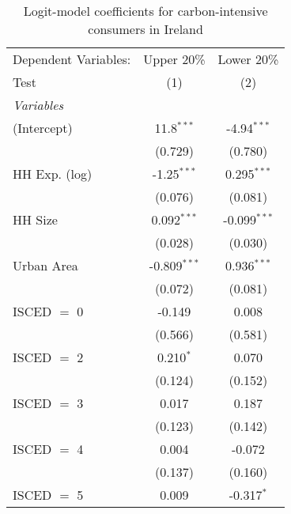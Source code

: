 
\begin{table}[htbp!]
   \centering
   \small
   \begin{adjustbox}{width = 1\textwidth, max height = 0.95\textheight, center}
      \begin{threeparttable}[b]
         \caption{\label{tab:Logit_1_IRL} Logit-model coefficients for carbon-intensive consumers in Ireland}
         \begin{tabular}{lcc}
            \tabularnewline \midrule \midrule
            Dependent Variables: & Upper 20\%     & Lower 20\%\\   
            Test                 & (1)            & (2)\\  
            \midrule
            \emph{Variables}\\
            (Intercept)          & 11.8$^{***}$   & -4.94$^{***}$\\   
                                 & (0.729)        & (0.780)\\   
            HH Exp. (log)        & -1.25$^{***}$  & 0.295$^{***}$\\   
                                 & (0.076)        & (0.081)\\   
            HH Size              & 0.092$^{***}$  & -0.099$^{***}$\\   
                                 & (0.028)        & (0.030)\\   
            Urban Area           & -0.809$^{***}$ & 0.936$^{***}$\\   
                                 & (0.072)        & (0.081)\\   
            ISCED $=$ 0          & -0.149         & 0.008\\   
                                 & (0.566)        & (0.581)\\   
            ISCED $=$ 2          & 0.210$^{*}$    & 0.070\\   
                                 & (0.124)        & (0.152)\\   
            ISCED $=$ 3          & 0.017          & 0.187\\   
                                 & (0.123)        & (0.142)\\   
            ISCED $=$ 4          & 0.004          & -0.072\\   
                                 & (0.137)        & (0.160)\\   
            ISCED $=$ 5          & 0.009          & -0.317$^{*}$\\   

\end{tabular}
\end{threeparttable}
\end{adjustbox}
\end{table}
